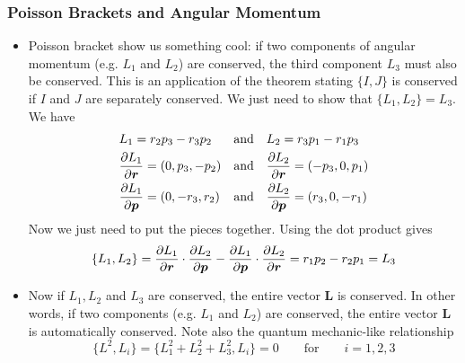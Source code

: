 \documentclass[11pt, a4paper]{article}
\newcommand{\eqtext}[1]{\qquad \text{#1} \qquad}
\begin{document}
\subsubsection{Poisson Brackets and Angular Momentum}
\begin{itemize}
	\item Poisson bracket show us something cool: if two components of angular momentum (e.g. $ L_{1} $ and $ L_{2} $) are conserved, the third component $ L_{3} $ must also be conserved. This is an application of the theorem stating $ \{I, J\} $ is conserved if $ I $ and $ J $ are separately conserved. We just need to show that $ \{L_{1}, L_{2}\} = L_{3}$. We have
	\begin{align*}
		&L_{1} = r_{2}p_{3} - r_{3}p_{2} && \text{and} && L_{2} = r_{3}p_{1} - r_{1}p_{3}\\
		&\pdv{L_{1}}{\bm{r}} = (0, p_{3}, -p_{2}) && \text{and} && \pdv{L_{2}}{\bm{r}} = (-p_{3},0, p_{1})\\
		&\pdv{L_{1}}{\bm{p}} = (0, -r_{3}, r_{2}) && \text{and} && \pdv{L_{2}}{\bm{p}} = (r_{3},0, -r_{1})
	\end{align*}
	Now we just need to put the pieces together. Using the dot product gives
	\begin{equation*}
		\{L_{1}, L_{2}\} = \pdv{L_{1}}{\bm{r}}\cdot \pdv{L_{2}}{\bm{p}} - \pdv{L_{1}}{\bm{p}}\cdot \pdv{L_{2}}{\bm{r}} = r_{1}p_{2} - r_{2}p_{1} = L_{3}
	\end{equation*}
	
	\item Now if $ L_{1}, L_{2} $ and $ L_{3} $ are conserved, the entire vector $ \bm{L} $ is conserved. In other words, if two components (e.g. $ L_{1} $ and $ L_{2} $) are conserved, the entire vector $ \bm{L} $ is automatically conserved. Note also the quantum mechanic-like relationship
	\begin{equation*}
		\{L^{2}, L_{i} \} = \{L_{1}^{2} + L_{2}^{2} + L_{3}^{2}, L_{i} \} = 0 \eqtext{for} i = 1, 2, 3
	\end{equation*}
	

\end{itemize}
\end{document}
